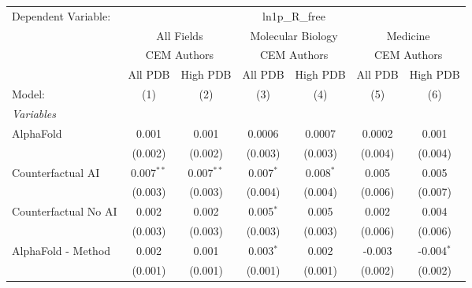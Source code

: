 \begingroup
\centering
\begin{tabular}{lcccccc}
   \tabularnewline \midrule \midrule
   Dependent Variable: & \multicolumn{6}{c}{ln1p\_R\_free}\\
 & \multicolumn{2}{c}{All Fields} & \multicolumn{2}{c}{Molecular Biology} & \multicolumn{2}{c}{Medicine} \\
\cmidrule(lr){2-3} \cmidrule(lr){4-5} \cmidrule(lr){6-7}
 & \multicolumn{2}{c}{CEM Authors} & \multicolumn{2}{c}{CEM Authors} & \multicolumn{2}{c}{CEM Authors} \\
\cmidrule(lr){2-3} \cmidrule(lr){4-5} \cmidrule(lr){6-7}
 & \multicolumn{1}{c}{All PDB} & \multicolumn{1}{c}{High PDB} & \multicolumn{1}{c}{All PDB} & \multicolumn{1}{c}{High PDB} & \multicolumn{1}{c}{All PDB} & \multicolumn{1}{c}{High PDB} \\
\cmidrule(lr){2-2} \cmidrule(lr){3-3} \cmidrule(lr){4-4} \cmidrule(lr){5-5} \cmidrule(lr){6-6} \cmidrule(lr){7-7}
   Model:                                                     & (1)          & (2)          & (3)          & (4)          & (5)     & (6)\\  
   \midrule
   \emph{Variables}\\
   AlphaFold                                                  & 0.001        & 0.001        & 0.0006       & 0.0007       & 0.0002  & 0.001\\   
                                                              & (0.002)      & (0.002)      & (0.003)      & (0.003)      & (0.004) & (0.004)\\   
   Counterfactual AI                                          & 0.007$^{**}$ & 0.007$^{**}$ & 0.007$^{*}$  & 0.008$^{*}$  & 0.005   & 0.005\\   
                                                              & (0.003)      & (0.003)      & (0.004)      & (0.004)      & (0.006) & (0.007)\\   
   Counterfactual No AI                                       & 0.002        & 0.002        & 0.005$^{*}$  & 0.005        & 0.002   & 0.004\\   
                                                              & (0.003)      & (0.003)      & (0.003)      & (0.003)      & (0.006) & (0.006)\\   
   AlphaFold - Method                                         & 0.002        & 0.001        & 0.003$^{*}$  & 0.002        & -0.003  & -0.004$^{*}$\\   
                                                              & (0.001)      & (0.001)      & (0.001)      & (0.001)      & (0.002) & (0.002)\\   

\end{tabular}
